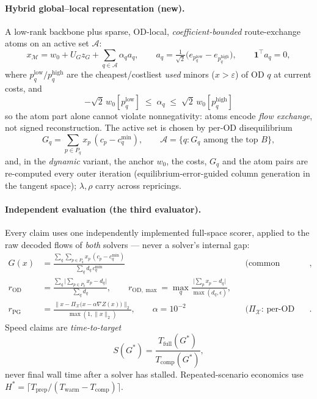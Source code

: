 \documentclass[11pt]{article}
\begin{document}
\paragraph{Hybrid global--local representation (new).} A low-rank backbone plus sparse,
OD-local, \emph{coefficient-bounded} route-exchange atoms on an active set $\mathcal A$:
\begin{equation}
x_{\mathcal M}=w_0+U_G z_G+\!\!\sum_{q\in\mathcal A}\!\alpha_q a_q,\qquad
a_q=\tfrac{1}{\sqrt2}\bigl(e_{p_q^{\mathrm{low}}}-e_{p_q^{\mathrm{high}}}\bigr),\qquad
\mathbf 1^\top a_q=0 ,
\label{eq:hybrid}
\end{equation}
where $p_q^{\mathrm{low}}/p_q^{\mathrm{high}}$ are the cheapest/costliest \emph{used}
minors ($x>\varepsilon$) of OD $q$ at current costs, and
\begin{equation}
-\sqrt2\,w_0[p_q^{\mathrm{low}}]\;\le\;\alpha_q\;\le\;\sqrt2\,w_0[p_q^{\mathrm{high}}]
\label{eq:bounds}
\end{equation}
so the atom part alone cannot violate nonnegativity: atoms encode \emph{flow exchange},
not signed reconstruction. The active set is chosen by per-OD disequilibrium
\begin{equation}
G_q=\sum_{p\in P_q}x_p\,(c_p-c_q^{\min}),\qquad
\mathcal A=\{q: G_q\text{ among the top }B\} ,
\label{eq:Gq}
\end{equation}
and, in the \emph{dynamic} variant, the anchor $w_0$, the costs, $G_q$ and the atom pairs
are re-computed every outer iteration (equilibrium-error-guided column generation in the
tangent space); $\lambda,\rho$ carry across repricings.

\paragraph{Independent evaluation (the third evaluator).} Every claim uses one
independently implemented full-space scorer, applied to the raw decoded flows of
\emph{both} solvers --- never a solver's internal gap:
\begin{align}
G(x)&=\frac{\sum_q\sum_{p\in P_q}x_p\,(c_p-c_q^{\min})}{\sum_q d_q\,c_q^{\min}}
&&\text{(common equilibrium gap, pool-min costs)},\label{eq:G}\\
r_{\mathrm{OD}}&=\frac{\sum_q\bigl|\sum_{p\in P_q}x_p-d_q\bigr|}{\sum_q d_q},
\qquad
r_{\mathrm{OD},\max}=\max_q\frac{\bigl|\sum_{p}x_p-d_q\bigr|}{\max(d_q,\epsilon)} ,\\
r_{\mathrm{PG}}&=\frac{\bigl\|x-\Pi_{\mathcal X}\bigl(x-\alpha\nabla Z(x)\bigr)\bigr\|_2}
{\max(1,\|x\|_2)},\qquad \alpha=10^{-2}
&&\text{($\Pi_{\mathcal X}$: per-OD Euclidean simplex proj.)}.
\end{align}
Speed claims are \emph{time-to-target}
\begin{equation}
S(G^\ast)=\frac{T_{\mathrm{full}}(G^\ast)}{T_{\mathrm{comp}}(G^\ast)} ,
\label{eq:S}
\end{equation}
never final wall time after a solver has stalled. Repeated-scenario economics use
$H^\ast=\lceil T_{\mathrm{prep}}/(T_{\mathrm{warm}}-T_{\mathrm{comp}})\rceil$.
\end{document}
